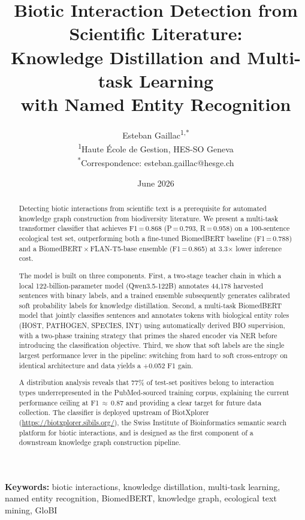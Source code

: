 \documentclass[12pt,a4paper]{article}
\title{Biotic Interaction Detection from Scientific Literature:\\
Knowledge Distillation and Multi-task Learning\\
with Named Entity Recognition}
\author{
Esteban Gaillac\textsuperscript{1,*} \\[4pt]
\textsuperscript{1}Haute \'Ecole de Gestion, HES-SO Geneva \\
\textsuperscript{*}Correspondence: esteban.gaillac@hesge.ch
}
\date{June 2026}
\begin{document}
\maketitle

\begin{abstract}
Detecting biotic interactions from scientific text is a prerequisite for
automated knowledge graph construction from biodiversity literature.
We present a multi-task transformer classifier that achieves F1\,=\,0.868
(P\,=\,0.793, R\,=\,0.958) on a 100-sentence ecological test set,
outperforming both a fine-tuned BiomedBERT baseline (F1\,=\,0.788) and
a BiomedBERT\,$\times$\,FLAN-T5-base ensemble (F1\,=\,0.865) at 3.3$\times$
lower inference cost.

The model is built on three components. First, a two-stage teacher chain
in which a local 122-billion-parameter model (Qwen3.5-122B) annotates
44,178 harvested sentences with binary labels, and a trained ensemble
subsequently generates calibrated soft probability labels for knowledge
distillation. Second, a multi-task BiomedBERT model that jointly classifies
sentences and annotates tokens with biological entity roles (HOST, PATHOGEN,
SPECIES, INT) using automatically derived BIO supervision, with a two-phase
training strategy that primes the shared encoder via NER before introducing
the classification objective. Third, we show that soft labels are the single
largest performance lever in the pipeline: switching from hard to soft
cross-entropy on identical architecture and data yields a +0.052 F1 gain.

A distribution analysis reveals that 77\% of test-set positives belong to
interaction types underrepresented in the PubMed-sourced training corpus,
explaining the current performance ceiling at F1\,$\approx$\,0.87 and
providing a clear target for future data collection. The classifier is
deployed upstream of BiotXplorer
(\url{https://biotxplorer.sibils.org/}), the Swiss Institute of Bioinformatics
semantic search platform for biotic interactions, and is designed as the
first component of a downstream knowledge graph construction pipeline.
\end{abstract}

\textbf{Keywords:} biotic interactions, knowledge distillation, multi-task
learning, named entity recognition, BiomedBERT, knowledge graph,
ecological text mining, GloBI

\end{document}
